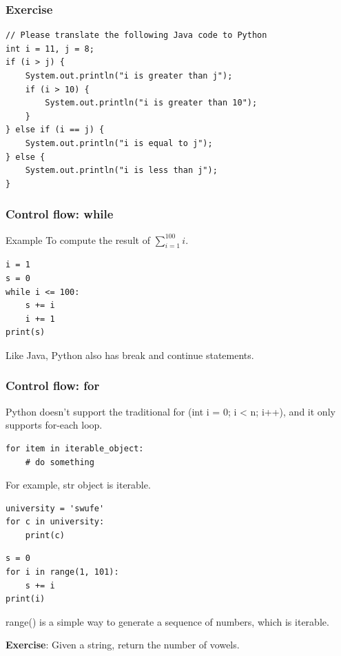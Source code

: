 \documentclass[aspectratio=169, 14pt]{beamer}
\begin{document}
\begin{frame}[fragile]
	\frametitle{Exercise}
	\begin{verbatim}
// Please translate the following Java code to Python
int i = 11, j = 8;
if (i > j) {
    System.out.println("i is greater than j");
    if (i > 10) {
        System.out.println("i is greater than 10");
    }
} else if (i == j) {
    System.out.println("i is equal to j");
} else {
    System.out.println("i is less than j");
}
  \end{verbatim}
\end{frame}

\begin{frame}[fragile]
	\frametitle{Control flow: while}
	\begin{block}{Example}
		To compute the result of $\sum_{i=1}^{100}{i}$.
	\end{block}

	\begin{verbatim}
i = 1
s = 0
while i <= 100:
    s += i
    i += 1
print(s)
  \end{verbatim}
	Like Java, Python also has \alert{break} and \alert{continue} statements.
\end{frame}

\begin{frame}[fragile]
	\frametitle{Control flow: for}
	Python doesn't support the traditional \alert{for (int i = 0; i < n; i++)}, and it only supports \alert{for-each} loop.

	\begin{verbatim}
for item in iterable_object:
    # do something
\end{verbatim}
	For example, \alert{str} object is iterable.

	\begin{verbatim}
university = 'swufe'
for c in university:
    print(c)
  \end{verbatim}
\end{frame}


\begin{frame}[fragile]

	\begin{verbatim}
s = 0
for i in range(1, 101):
    s += i
print(i)
  \end{verbatim}
	\alert{range()} is a simple way to generate a sequence of numbers, which is iterable.

	\pause

	\textbf{Exercise}: Given a string, return the number of vowels.
\end{frame}
\end{document}
